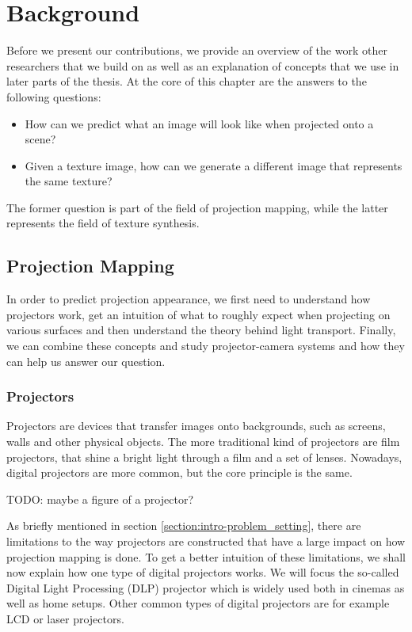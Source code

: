 \chapter{Background}
\label{chapter:background} 


Before we present our contributions, we provide an overview of the work other researchers that we build on as well as an explanation of concepts that we use in later parts of the thesis. At the core of this chapter are the answers to the following questions:

\begin{itemize}
    \item How can we predict what an image will look like when projected onto a scene?
    \item Given a texture image, how can we generate a different image that represents the same texture?
\end{itemize}

The former question is part of the field of projection mapping, while the latter represents the field of texture synthesis.

\section{Projection Mapping}
\label{section:background-projection_mapping}

In order to predict projection appearance, we first need to understand how projectors work, get an intuition of what to roughly expect when projecting on various surfaces and then understand the theory behind light transport. Finally, we can combine these concepts and study projector-camera systems and how they can help us answer our question.

\subsection{Projectors}
\label{section:background-projection_mapping-projectors}

Projectors are devices that transfer images onto backgrounds, such as screens, walls and other physical objects. The more traditional kind of projectors are film projectors, that shine a bright light through a film and a set of lenses. Nowadays, digital projectors are more common, but the core principle is the same.

{\color{red} TODO: maybe a figure of a projector?}

As briefly mentioned in section \ref{section:intro-problem_setting}, there are limitations to the way projectors are constructed that have a large impact on how projection mapping is done. To get a better intuition of these limitations, we shall now explain how one type of digital projectors works. We will focus the so-called Digital Light Processing (DLP) projector which is widely used both in cinemas as well as home setups. Other common types of digital projectors are for example LCD or laser projectors.

